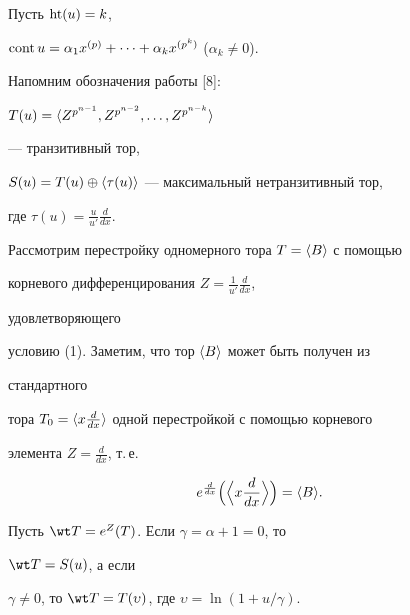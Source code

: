  


Пусть $\operatorname{ht}(u)=k$, 


$\operatorname{cont} u=\alpha_1x^{(p)}+\dotsb+\alpha_k x^{(p^k)}$ ($\alpha_k\ne 0$). 


Напомним обозначения работы [8]: 


$T(u)=\langle Z^{p^{n-1}},Z^{p^{n-2}},\dotsc,Z^{p^{n-k}}\rangle$ 


--- транзитивный тор, 


$S(u)=T(u)\oplus\langle\tau(u)\rangle$ --- максимальный нетранзитивный тор, 


где $\tau(u)=\frac{u}{u'}\frac{d}{dx}$. 


 


Рассмотрим перестройку одномерного тора $T=\langle B\rangle$ с помощью 


корневого дифференцирования $Z=\frac{1}{u'}\frac{d}{dx}$, 


удовлетворяющего 


условию (1). Заметим, что тор $\langle B\rangle$ может быть получен из 


стандартного 


тора $T_0=\langle x\frac{d}{dx}\rangle$ одной перестройкой с помощью корневого 


элемента $Z=\frac{d}{dx}$, т.\,е. 


$$ 


e^{\frac{d}{dx}}\Big(\Big\la x\frac{d}{dx}\Big\ra\Big)=\la B\ra. 


$$ 


 


\begin{thm} Пусть $\wt T=e^Z(T)$. Если $\gamma=\alpha+1=0$, то 


$\wt T=S(u)$, а если 


$\gamma\ne 0$, то $\wt T=T(\upsilon)$, где $\upsilon=\ln(1+u/\gamma)$. 


\end{thm} 


 


